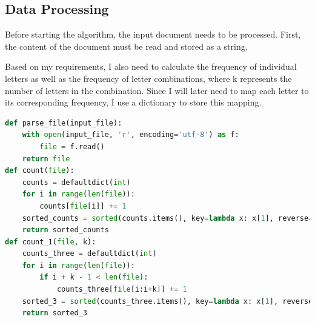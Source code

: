 \documentclass[12pt]{article}
\begin{document}
\subsection{Data Processing}
\par Before starting the algorithm, the input document needs to be processed. First, the content of the document must be read and stored as a string. 
\par Based on my requirements, I also need to calculate the frequency of individual letters as well as the frequency of letter combinations, where k represents the number of letters in the combination. Since I will later need to map each letter to its corresponding frequency, I use a dictionary to store this mapping.
\begin{tcolorbox}[colframe=black, colback=white, boxrule=0.4mm, sharp corners=southwest, title=Data Processing Code]
\begin{lstlisting}[language=Python, breaklines=true]
def parse_file(input_file):
    with open(input_file, 'r', encoding='utf-8') as f:
        file = f.read() 
    return file
def count(file):
    counts = defaultdict(int)   
    for i in range(len(file)):
        counts[file[i]] += 1
    sorted_counts = sorted(counts.items(), key=lambda x: x[1], reverse=True)
    return sorted_counts
def count_1(file, k):
    counts_three = defaultdict(int)  
    for i in range(len(file)):
        if i + k - 1 < len(file): 
            counts_three[file[i:i+k]] += 1
    sorted_3 = sorted(counts_three.items(), key=lambda x: x[1], reverse=True)
    return sorted_3
\end{lstlisting}
\end{tcolorbox}
\end{document}
